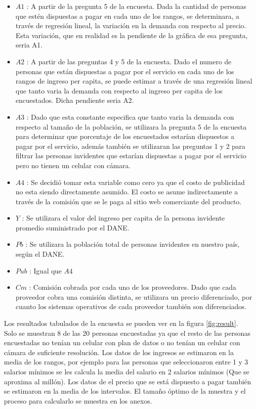 \documentclass[a4paper, 12pt, oneside]{article}
\begin{document}
	\begin{itemize}
	      \item $A1$ : A partir de la pregunta 5 de la encuesta. Dada la cantidad de personas que estén dispuestas a pagar en cada uno de los rangos, se determinara, a través de regresión lineal, la variación en la demanda con respecto al precio. Esta variación, que en realidad es la pendiente de la gráfica de esa pregunta, seria A1.
	      \item $A2$ : A partir de las preguntas 4 y 5 de la encuesta. Dado el numero de personas que están dispuestas a pagar por el servicio en cada uno de los rangos de ingreso per capita, se puede estimar a través de una regresión lineal que tanto varia la demanda con respecto al ingreso per capita de los encuestados. Dicha pendiente seria A2.
	      \item $A3$ : Dado que esta constante especifica que tanto varia la demanda con respecto al tamaño de la población, se utilizara la pregunta 5 de la encuesta para determinar que porcentaje de los encuestados estarían dispuestos a pagar por el servicio, además también se utilizaran las preguntas 1 y 2 para filtrar las personas invidentes que estarían dispuestas a pagar por el servicio pero no tienen un celular con cámara.
	      \item $A4$ : Se decidió tomar esta variable como cero ya que el costo de publicidad no esta siendo directamente asumido. El costo se asume indirectamente a través de la comisión que se le paga al sitio web comerciante del producto.
	      \item $Y$ : Se utilizara el valor del ingreso per capita de la persona invidente promedio suministrado por el DANE.
	      \item $Pb$ : Se utilizara la población total de personas invidentes en nuestro país, según el DANE.
	      \item $Pub$ : Igual que $A4$
	      \item $Cm$ : Comisión cobrada por cada uno de los proveedores. Dado que cada proveedor cobra una comisión distinta, se utilizara un precio diferenciado, por cuanto los sistemas operativos de cada proveedor también son diferenciados.
	\end{itemize}
	
	Los resultados tabulados de la encuesta se pueden ver en la figura \ref{fig:result}. Solo se muestran 8 de las 20 personas encuestadas ya que el resto de las personas encuestadas no tenían un celular con plan de datos o no tenían un celular con cámara de suficiente resolución. Los datos de los ingresos se estimaron en la media de los rangos, por ejemplo para las personas que seleccionaron entre 1 y 3 salarios mínimos se les calcula la media del salario en 2 salarios mínimos (Que se aproxima al millón). Los datos de el precio que se está dispuesto a pagar también se estimaron en la media de los intervalos. El tamaño óptimo de la muestra y el proceso para calcularlo se muestra en los anexos.
	
\end{document}
